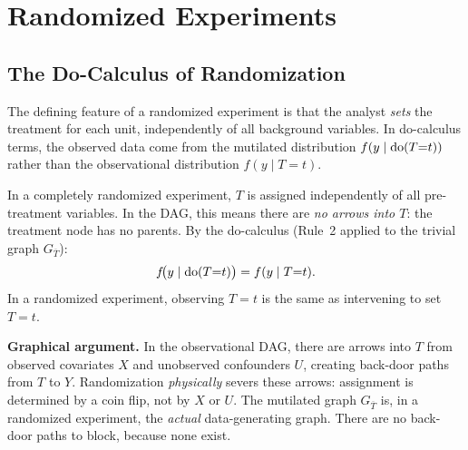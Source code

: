 \documentclass[master.tex]{subfiles}
\begin{document}
\section{Randomized Experiments}
\label{w5:sec:rct}

\subsection{The Do-Calculus of Randomization}

The defining feature of a randomized experiment is that the analyst
\emph{sets} the treatment for each unit, independently of all background
variables.  In do-calculus terms, the observed data come from the
mutilated distribution $f(y \mid \mathrm{do}(T{=}t))$ rather than the
observational distribution $f(y \mid T{=}t)$.

\begin{tcolorbox}[defstyle, title={The Fundamental Equality of Randomized Experiments}]
In a completely randomized experiment, $T$ is assigned independently of
all pre-treatment variables.  In the DAG, this means there are
\emph{no arrows into $T$}: the treatment node has no parents.
By the do-calculus (Rule~2 applied to the trivial graph
$G_{\overline{T}}$):
\begin{equation}
  f\!\bigl(y \mid \mathrm{do}(T{=}t)\bigr) = f(y \mid T{=}t).
  \label{w5:eq:fund-eq}
\end{equation}
In a randomized experiment, observing $T = t$ is the same as intervening
to set $T = t$.
\end{tcolorbox}

\noindent\textbf{Graphical argument.}  In the observational DAG, there
are arrows into $T$ from observed covariates $X$ and unobserved
confounders $U$, creating back-door paths from $T$ to $Y$.
Randomization \emph{physically} severs these arrows: assignment is
determined by a coin flip, not by $X$ or $U$.  The mutilated graph
$G_{\overline{T}}$ is, in a randomized experiment, the \emph{actual}
data-generating graph.  There are no back-door paths to block, because
none exist.
\end{document}
